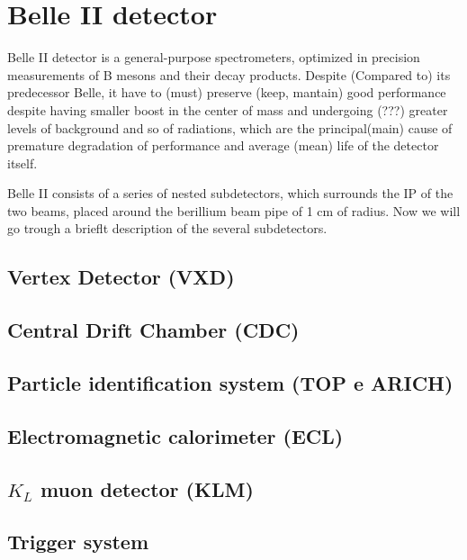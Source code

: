 \newpage





\section{Belle II detector}

Belle II detector is a general-purpose spectrometers, optimized in precision measurements of B mesons and their decay products. Despite (Compared to) its predecessor Belle, it have to (must) preserve (keep, mantain) good performance despite having smaller boost in the center of mass and undergoing (???) greater levels of background and so of radiations, which are the principal(main) cause of premature degradation of performance and average (mean) life of the detector itself.

Belle II consists of a series of nested subdetectors, which surrounds the IP of the two beams, placed around the berillium beam pipe of 1 cm of radius. Now we will go trough a brieflt description of the several subdetectors. 

\subsection{Vertex Detector (VXD)}

\subsection{Central Drift Chamber (CDC)}

\subsection{Particle identification system (TOP e ARICH)}

\subsection{Electromagnetic calorimeter (ECL)}

\subsection{$K_{L}$ muon detector (KLM)}

\subsection{Trigger system}





